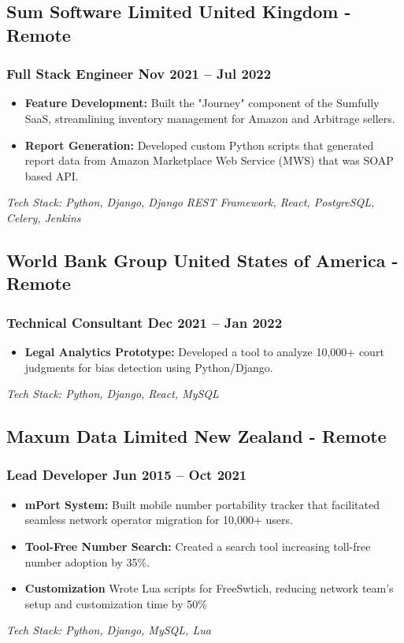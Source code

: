 \documentclass[11pt]{article} %
\newcommand \techstack [1]
    {\small\textit{Tech Stack: {#1}}} %
\begin{document}
\subsection{Sum Software Limited \hfill United Kingdom - Remote}
\subsubsection{Full Stack Engineer \hfill  Nov 2021 -- Jul 2022}
\begin{itemize}
    \item \textbf{Feature Development:} Built the "Journey" component of the Sumfully SaaS, streamlining inventory management for Amazon and Arbitrage sellers.
    \item \textbf{Report Generation:} Developed custom Python scripts that generated report data from Amazon Marketplace Web Service (MWS) that was SOAP based API.
\end{itemize}
\techstack{Python, Django, Django REST Framework, React, PostgreSQL, Celery, Jenkins}


\subsection{World Bank Group \hfill United States of America - Remote}
\subsubsection{Technical Consultant \hfill  Dec 2021 -- Jan 2022}
\begin{itemize}
    \item \textbf{Legal Analytics Prototype:} Developed a tool to analyze 10,000+ court judgments for bias detection using Python/Django.
\end{itemize}
\techstack{Python, Django, React, MySQL}


\subsection{Maxum Data Limited \hfill New Zealand - Remote}
\subsubsection{Lead Developer \hfill  Jun 2015 -- Oct 2021}
\begin{itemize}
    \item \textbf{mPort System:} Built mobile number portability tracker that facilitated seamless network operator migration for 10,000+ users.
    \item \textbf{Tool-Free Number Search: } Created a search tool increasing toll-free number adoption by 35\%.
    \item \textbf{Customization} Wrote Lua scripts for FreeSwtich, reducing network team's setup and customization time by 50\%
\end{itemize}
\techstack{Python, Django, MySQL, Lua}
\end{document}
